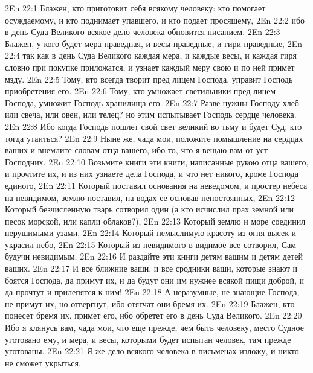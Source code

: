 \vs 2En 22:1
Блажен, кто приготовит себя всякому человеку: кто помогает осуждаемому, и кто поднимает упавшего, и кто подает просящему,
\vs 2En 22:2
ибо в день Суда Великого всякое дело человека обновится писанием.
\vs 2En 22:3
Блажен, у кого будет мера праведная, и весы праведные, и гири праведные,
\vs 2En 22:4
так как в день Суда Великого каждая мера, и каждые весы, и каждая гиря словно при покупке приложатся, и узнает каждый меру свою и по ней примет мзду.
\vs 2En 22:5
Тому, кто всегда творит пред лицем Господа, управит Господь приобретения его.
\vs 2En 22:6
Тому, кто умножает светильники пред лицем Господа, умножит Господь хранилища его.
\vs 2En 22:7
Разве нужны Господу хлеб или свеча, или овен, или телец? но этим испытывает Господь сердце человека.
\vs 2En 22:8
Ибо когда Господь пошлет свой свет великий во тьму и будет Суд, кто тогда утаиться?
\vs 2En 22:9
Ныне же, чада мои, положите помышление на сердцах ваших и внемлите словам отца вашего, ибо то, что я вещаю вам от уст Господних.
\vs 2En 22:10
Возьмите книги эти книги, написанные рукою отца вашего, и прочтите их, и из них узнаете дела Господа, и что нет никого, кроме Господа единого,
\vs 2En 22:11
Который поставил основания на неведомом, и простер небеса на невидимом, землю поставил, на водах ее основав непостоянных,
\vs 2En 22:12
Который безчисленную тварь сотворил один (а кто исчислил прах земной или песок морской, или капли облаков?),
\vs 2En 22:13
Который землю и море соединил нерушимыми узами,
\vs 2En 22:14
Который немыслимую красоту из огня высек и украсил небо,
\vs 2En 22:15
Который из невидимого в видимое все сотворил, Сам будучи невидимым.
\vs 2En 22:16
И раздайте эти книги детям вашим и детям детей ваших.
\vs 2En 22:17
И все ближние ваши, и все сродники ваши, которые знают и боятся Господа, да примут их, и да будут они им нужнее всякой пищи доброй, и да прочтут и прилепятся к ним!
\vs 2En 22:18
А неразумные, не знающие Господа, не примут их, но отвергнут, ибо отягчат они бремя их.
\vs 2En 22:19
Блажен, кто понесет бремя их, примет его, ибо обретет его в день Суда Великого.
\vs 2En 22:20
Ибо я клянусь вам, чада мои, что еще прежде, чем быть человеку, место Судное уготовано ему, и мера, и весы, которыми будет испытан человек, там прежде уготованы.
\vs 2En 22:21
Я же дело всякого человека в письменах изложу, и никто не сможет укрыться.


